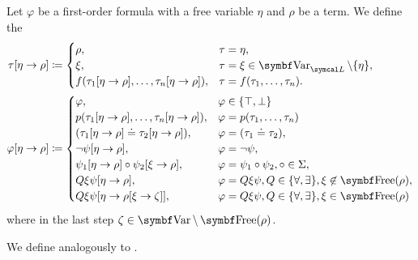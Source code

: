 \begin{definition}\label{def:first_order_substition}
  Let \( \varphi \) be a first-order formula with a free variable \( \eta \) and \( \rho \) be a term. We define the 
  \begin{align*}
    \tau[\eta \to \rho] &\coloneqq \begin{cases}
      \rho,                                                    &\tau = \eta, \\
      \xi,                                                     &\tau = \xi \in \Cat{Var}_{\Cal{L}} \setminus \{ \eta \}, \\
      f(\tau_1[\eta \to \rho], \ldots, \tau_n[\eta \to \rho]), &\tau = f(\tau_1, \ldots, \tau_n).
    \end{cases}
    \\
    \varphi[\eta \to \rho] &\coloneqq \begin{cases}
      \varphi,                                                 &\varphi \in \{ \top, \bot \} \\
      p(\tau_1[\eta \to \rho], \ldots, \tau_n[\eta \to \rho]), &\varphi = p(\tau_1, \ldots, \tau_n) \\
      (\tau_1[\eta \to \rho] \doteq \tau_2[\eta \to \rho]),    &\varphi = (\tau_1 \doteq \tau_2), \\
      \neg \psi[\eta \to \rho],                                &\varphi = \neg \psi, \\
      \psi_1[\eta \to \rho] \circ \psi_2[\xi \to \rho],          &\varphi = \psi_1 \circ \psi_2, \circ \in \Sigma, \\
      Q \xi \psi[\eta \to \rho],                               &\varphi = Q \xi \psi, Q \in \{ \forall, \exists \}, \xi \not\in \Cat{Free}(\rho), \\
      Q \xi \psi[\eta \to \rho[\xi \to \zeta]],                &\varphi = Q \xi \psi, Q \in \{ \forall, \exists \}, \xi \in \Cat{Free}(\rho)
    \end{cases}
  \end{align*}
  where in the last step \( \zeta \in \Cat{Var} \setminus \Bold{Free}(\rho) \).

  We define  analogously to .
\end{definition}

